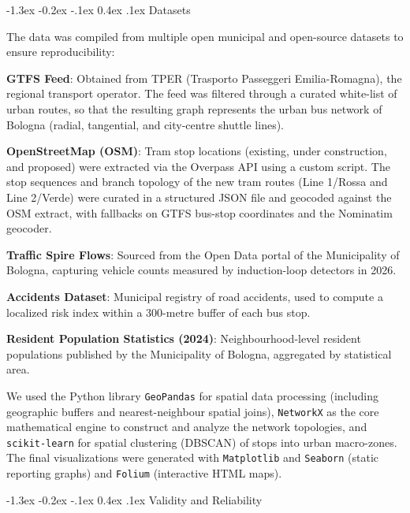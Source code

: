 \documentclass[12pt, a4paper]{article}
\makeatletter
\renewcommand\section{\@startsection {section}{1}{\z@}%
                                   {-1.3ex \@plus -0.2ex \@minus -.1ex}%
                                   {0.4ex \@plus.1ex}%
                                   {\normalfont\Large\bfseries}}
\let\oldenumerate\enumerate
\let\endoldenumerate\endenumerate
\renewenvironment{enumerate}{\oldenumerate\setlength{\itemsep}{0pt}\setlength{\parskip}{0pt}\setlength{\parsep}{0pt}\setlength{\topsep}{0pt}\setlength{\partopsep}{0pt}}{\endoldenumerate}
\makeatother
\begin{document}
\section{Datasets}
\label{datasets}

The data was compiled from multiple open municipal and open-source datasets to ensure reproducibility:
\begin{enumerate}
    \item \textbf{GTFS Feed}: Obtained from TPER (Trasporto Passeggeri Emilia-Romagna), the regional transport operator. The feed was filtered through a curated white-list of urban routes, so that the resulting graph represents the urban bus network of Bologna (radial, tangential, and city-centre shuttle lines).
    \item \textbf{OpenStreetMap (OSM)}: Tram stop locations (existing, under construction, and proposed) were extracted via the Overpass API using a custom script. The stop sequences and branch topology of the new tram routes (Line 1/Rossa and Line 2/Verde) were curated in a structured JSON file and geocoded against the OSM extract, with fallbacks on GTFS bus-stop coordinates and the Nominatim geocoder.
    \item \textbf{Traffic Spire Flows}: Sourced from the Open Data portal of the Municipality of Bologna, capturing vehicle counts measured by induction-loop detectors in 2026.
    \item \textbf{Accidents Dataset}: Municipal registry of road accidents, used to compute a localized risk index within a 300-metre buffer of each bus stop.
    \item \textbf{Resident Population Statistics (2024)}: Neighbourhood-level resident populations published by the Municipality of Bologna, aggregated by statistical area.
\end{enumerate}

We used the Python library \texttt{GeoPandas} for spatial data processing (including geographic buffers and nearest-neighbour spatial joins), \texttt{NetworkX} as the core mathematical engine to construct and analyze the network topologies, and \texttt{scikit-learn} for spatial clustering (DBSCAN) of stops into urban macro-zones. The final visualizations were generated with \texttt{Matplotlib} and \texttt{Seaborn} (static reporting graphs) and \texttt{Folium} (interactive HTML maps).

\section{Validity and Reliability}
\label{validity-and-reliability}
\end{document}
